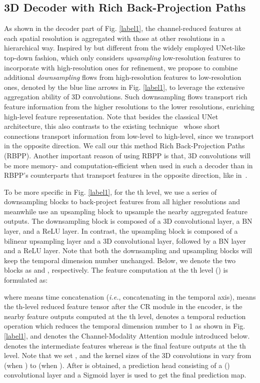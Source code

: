 \documentclass[letterpaper]{article}
\def\ie{\emph{i.e.}}
\begin{document}
\subsection{3D Decoder with Rich Back-Projection Paths}
As shown in the decoder part of Fig. \ref{label1}, the channel-reduced features at each spatial resolution is aggregated with those at other resolutions in a hierarchical way. Inspired by but different from the widely employed UNet-like top-down fashion, which only considers \emph{upsampling} low-resolution features to incorporate with high-resolution ones for refinement, we propose to combine additional  \emph{downsampling} flows from high-resolution features to low-resolution ones, denoted by the blue line arrows in Fig. \ref{label1}, to leverage the extensive aggregation ability of 3D convolutions. Such downsampling flows transport rich feature information from the higher resolutions to the lower resolutions, enriching high-level feature representation. Note that besides the classical UNet architecture, this also contrasts to the existing technique~\cite{hou2017deeply} whose short connections transport information from low-level to high-level, since we transport in the opposite direction. We call our this method Rich Back-Projection Paths (RBPP). Another important reason of using RBPP is that, 3D convolutions will be more memory- and computation-efficient when used in such a decoder than in RBPP's counterparts that transport features in the opposite direction, like in~\cite{hou2017deeply}.

To be more specific in Fig. \ref{label1}, for the th level, we use a series of downsampling blocks to back-project features from all higher resolutions and meanwhile use an upsampling block to upsample the nearby aggregated feature outputs. The downsampling block is composed of a  3D convolutional layer, a BN layer, and a ReLU layer. In contrast, the upsampling block is composed of a bilinear upsampling layer and a  3D convolutional layer, followed by a BN layer and a ReLU layer. Note that both the downsampling and upsampling blocks will keep the temporal dimension number unchanged. Below, we denote the two blocks as  and , respectively. The feature computation at the th level () is formulated as:

\vspace{-0.2cm}


\noindent where  means time concatenation (\ie, concatenating in the temporal axis),  means the th-level reduced feature tensor after the CR module in the encoder,  is the nearby feature outputs computed at the th level,  denotes a temporal reduction operation which reduces the temporal dimension number to 1 as shown in Fig. \ref{label1}, and  denotes the Channel-Modality Attention module introduced below.  denotes the intermediate features whereas  is the final feature outputs at the th level. Note that we set , and the kernel sizes of the 3D convolutions in  vary from  (when ) to  (when ). After  is obtained, a prediction head consisting of a () convolutional layer and a Sigmoid layer is used to get the final prediction map.
\end{document}
